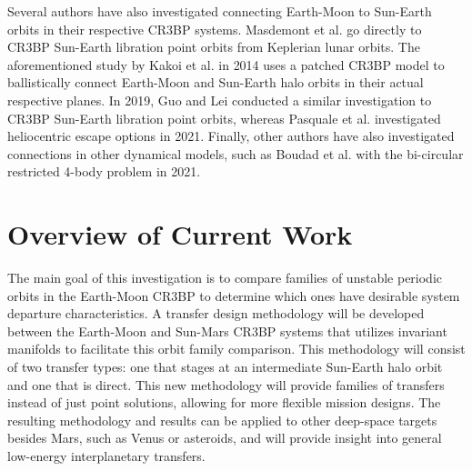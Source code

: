 Several authors have also investigated connecting Earth-Moon to Sun-Earth orbits in their
respective CR3BP systems. Masdemont et al. go directly to CR3BP Sun-Earth libration point orbits
from Keplerian lunar orbits\cite{Masdemont:2021}. The aforementioned study by Kakoi et al. in 2014
uses a patched CR3BP model to ballistically connect Earth-Moon and Sun-Earth halo orbits in their
actual respective planes\cite{Kakoi:2014}. In 2019, Guo and Lei conducted a similar investigation
to CR3BP Sun-Earth libration point orbits\cite{Guo:2019}, whereas Pasquale et al. investigated
heliocentric escape options in 2021\cite{Pasquale:2021}. Finally, other authors have also
investigated connections in other dynamical models, such as Boudad et al. with the bi-circular
restricted 4-body problem in 2021\cite{Boudad:2021}.

\section{Overview of Current Work}
The main goal of this investigation is to compare families of unstable periodic orbits in the
Earth-Moon CR3BP to determine which ones have desirable system departure characteristics. A
transfer design methodology will be developed between the Earth-Moon and Sun-Mars CR3BP systems
that utilizes invariant manifolds to facilitate this orbit family comparison. This methodology will
consist of two transfer types: one that stages at an intermediate Sun-Earth halo orbit and one that
is direct. This new methodology will provide families of transfers instead of just point solutions,
allowing for more flexible mission designs. The resulting methodology and results can be applied to
other deep-space targets besides Mars, such as Venus or asteroids, and will provide insight into
general low-energy interplanetary transfers.

